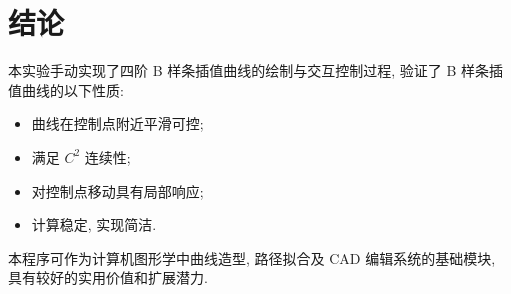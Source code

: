 \documentclass[12pt,a4paper]{article}
\begin{document}
    \section{结论}
        本实验手动实现了四阶 B 样条插值曲线的绘制与交互控制过程, 验证了 B 样条插值曲线的以下性质:
        \begin{itemize}
            \item 曲线在控制点附近平滑可控;
            \item 满足 $C^2$ 连续性;
            \item 对控制点移动具有局部响应;
            \item 计算稳定, 实现简洁.
        \end{itemize}

        本程序可作为计算机图形学中曲线造型, 路径拟合及 CAD 编辑系统的基础模块, 具有较好的实用价值和扩展潜力.
\end{document}
